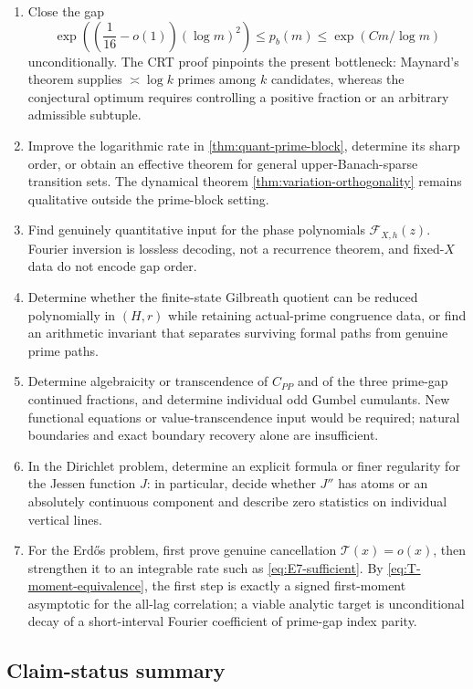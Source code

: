 \documentclass[11pt]{article}
\theoremstyle{definition}
\theoremstyle{remark}
\begin{document}
\begin{enumerate}
 \item Close the gap
 \[
  \exp\!\left(\left(\frac1{16}-o(1)\right)(\log m)^2\right)\le p_b(m)
  \le\exp(Cm/\log m)
 \]
 unconditionally.  The CRT proof pinpoints the present bottleneck: Maynard's theorem
 supplies $\asymp\log k$ primes among $k$ candidates, whereas the conjectural optimum
 requires controlling a positive fraction or an arbitrary admissible subtuple.
 \item Improve the logarithmic rate in \cref{thm:quant-prime-block}, determine its sharp
 order, or obtain an effective theorem for general upper-Banach-sparse transition sets.
 The dynamical theorem \cref{thm:variation-orthogonality} remains qualitative outside
 the prime-block setting.
 \item Find genuinely quantitative input for the phase polynomials
 $\mathcal F_{X,h}(z)$.  Fourier inversion is lossless decoding, not a recurrence theorem,
 and fixed-$X$ data do not encode gap order.
 \item Determine whether the finite-state Gilbreath quotient can be reduced
 polynomially in $(H,r)$ while retaining actual-prime congruence data, or find an
 arithmetic invariant that separates surviving formal paths from genuine prime paths.
 \item Determine algebraicity or transcendence of $C_{PP}$ and of the three prime-gap
 continued fractions, and determine individual odd Gumbel cumulants.  New functional
 equations or value-transcendence input would be required; natural boundaries and exact
 boundary recovery alone are insufficient.
 \item In the Dirichlet problem, determine an explicit formula or finer regularity for the
 Jessen function $J$: in particular, decide whether $J''$ has atoms or an absolutely
 continuous component and describe zero statistics on individual vertical lines.
 \item For the Erd\H{o}s problem, first prove genuine cancellation
 $\mathcal T(x)=o(x)$, then strengthen it to an integrable rate such as
 \eqref{eq:E7-sufficient}.  By \eqref{eq:T-moment-equivalence}, the first step is exactly
 a signed first-moment asymptotic for the all-lag correlation; a viable analytic target is
 unconditional decay of a short-interval Fourier coefficient of prime-gap index parity.
\end{enumerate}

\subsection{Claim-status summary}
\end{document}

